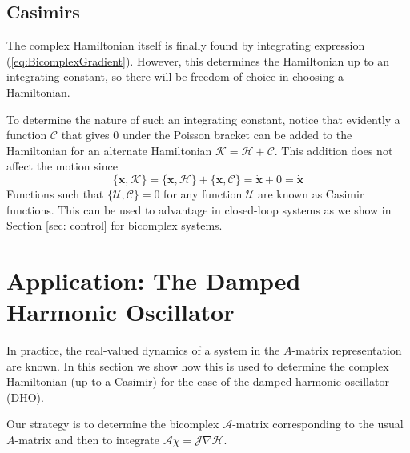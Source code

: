  \subsection{Casimirs}
\label{sec:Casimirs}
The complex Hamiltonian itself is finally found by integrating  expression (\ref{eq:BicomplexGradient}).  However, this determines the Hamiltonian up to an integrating constant, so there will be freedom of choice in choosing a Hamiltonian.  

To determine the nature of such an integrating constant, notice that
evidently a  function $\mathcal{C}$ that gives 0 under the Poisson bracket can be added to the Hamiltonian for an alternate Hamiltonian $\mathcal{K} = \mathcal{H} + \mathcal{C}$.
This addition does not affect the motion since
\begin{equation}
    \{\textbf{x},\mathcal{K}\} = \{\textbf{x},\mathcal{H}\} 
    + \{\textbf{x}, \mathcal{C}\} = \dot{\textbf{x}} + 0 = \dot{\textbf{x}}
\end{equation}
Functions such that $\{ \mathcal{U},\mathcal{C} \} = 0$  for any  function $\mathcal{U}$ are known as Casimir functions. This can be used to advantage in closed-loop systems as we show in Section \ref{sec: control} for bicomplex systems. 


\section{Application: The Damped Harmonic Oscillator}
\label{sec: dho}
In practice, the real-valued dynamics of a system in the $A$-matrix representation are known. 
In this section we show how this is used to determine the complex Hamiltonian (up to a Casimir) for the case of the damped harmonic oscillator (DHO).  

Our strategy is to determine the bicomplex $\mathcal{A}$-matrix corresponding to the usual $A$-matrix and then to integrate $\mathcal{A}\chi = \mathcal{J}\nabla \mathcal{H}$.


